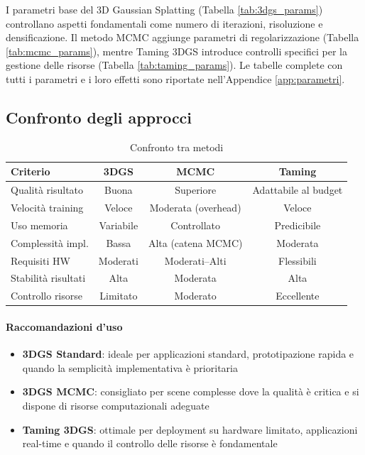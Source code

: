 I parametri base del 3D Gaussian Splatting (Tabella \ref{tab:3dgs_params}) controllano aspetti fondamentali come numero di iterazioni, risoluzione e densificazione. Il metodo MCMC aggiunge parametri di regolarizzazione (Tabella \ref{tab:mcmc_params}), mentre Taming 3DGS introduce controlli specifici per la gestione delle risorse (Tabella \ref{tab:taming_params}). Le tabelle complete con tutti i parametri e i loro effetti sono riportate nell'Appendice \ref{app:parametri}.


\subsection{Confronto degli approcci}

\begin{table}[h]
	\centering
	\small
	\begin{tabular}{|l|c|c|c|}
		\hline
		\textbf{Criterio} & \textbf{3DGS} & \textbf{MCMC} & \textbf{Taming} \\
		\hline
		Qualità risultato & Buona & Superiore & Adattabile al budget \\
		\hline
		Velocità training & Veloce & Moderata (overhead) & Veloce \\
		\hline
		Uso memoria & Variabile & Controllato & Predicibile \\
		\hline
		Complessità impl. & Bassa & Alta (catena MCMC) & Moderata \\
		\hline
		Requisiti HW & Moderati & Moderati–Alti & Flessibili \\
		\hline
		Stabilità risultati & Alta & Moderata & Alta \\
		\hline
		Controllo risorse & Limitato & Moderato & Eccellente \\
		\hline
	\end{tabular}
	\caption{Confronto tra metodi}
\end{table}

\paragraph{Raccomandazioni d'uso}
\begin{itemize}
	\item \textbf{3DGS Standard}: ideale per applicazioni standard, prototipazione rapida e quando la semplicità implementativa è prioritaria
	\item \textbf{3DGS MCMC}: consigliato per scene complesse dove la qualità è critica e si dispone di risorse computazionali adeguate
	\item \textbf{Taming 3DGS}: ottimale per deployment su hardware limitato, applicazioni real-time e quando il controllo delle risorse è fondamentale
\end{itemize}

